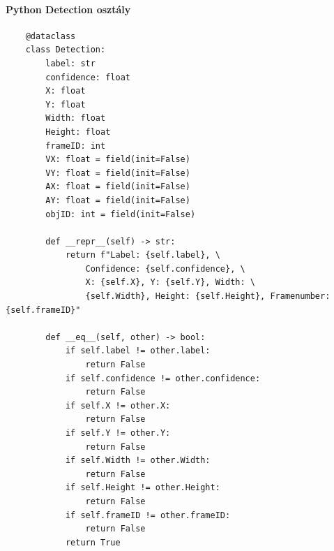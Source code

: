 \documentclass[12pt,a4paper]{article}
\begin{document}
\paragraph{Python Detection osztály}
\begin{verbatim}
    @dataclass
    class Detection:
        label: str
        confidence: float
        X: float
        Y: float
        Width: float
        Height: float
        frameID: int
        VX: float = field(init=False)
        VY: float = field(init=False)
        AX: float = field(init=False)
        AY: float = field(init=False)
        objID: int = field(init=False)

        def __repr__(self) -> str:
            return f"Label: {self.label}, \
                Confidence: {self.confidence}, \
                X: {self.X}, Y: {self.Y}, Width: \
                {self.Width}, Height: {self.Height}, Framenumber: {self.frameID}"

        def __eq__(self, other) -> bool:
            if self.label != other.label:
                return False
            if self.confidence != other.confidence:
                return False
            if self.X != other.X:
                return False
            if self.Y != other.Y:
                return False
            if self.Width != other.Width:
                return False
            if self.Height != other.Height:
                return False
            if self.frameID != other.frameID:
                return False
            return True
\end{verbatim}
\end{document}
